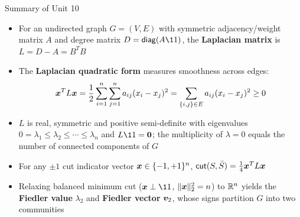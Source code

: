 \documentclass[aspectratio=169]{beamer}\usepackage[]{graphicx}\usepackage[]{xcolor}
\makeatletter
\newcommand{\hlnum}[1]{\textcolor[rgb]{0.686,0.059,0.569}{#1}}%
\newcommand{\hlopt}[1]{\textcolor[rgb]{0,0,0}{#1}}%
\newcommand{\hldef}[1]{\textcolor[rgb]{0.345,0.345,0.345}{#1}}%
\newcommand{\hlkwb}[1]{\textcolor[rgb]{0.69,0.353,0.396}{#1}}%
\newcommand{\hlkwc}[1]{\textcolor[rgb]{0.333,0.667,0.333}{#1}}%
\newcommand{\hlkwd}[1]{\textcolor[rgb]{0.737,0.353,0.396}{\textbf{#1}}}%
\newenvironment{kframe}{%
 \def\at@end@of@kframe{}%
 \ifinner\ifhmode%
  \def\at@end@of@kframe{\end{minipage}}%
  \begin{minipage}{\columnwidth}%
 \fi\fi%
 \def\FrameCommand##1{\hskip\@totalleftmargin \hskip-\fboxsep
 \colorbox{shadecolor}{##1}\hskip-\fboxsep
     \hskip-\linewidth \hskip-\@totalleftmargin \hskip\columnwidth}%
 \MakeFramed {\advance\hsize-\width
   \@totalleftmargin\z@ \linewidth\hsize
   \@setminipage}}%
 {\par\unskip\endMakeFramed%
 \at@end@of@kframe}
\newenvironment{knitrout}{}{} %
\makeatother
\begin{document}






\begin{frame}{Summary of Unit 10}
\begin{itemize}
\item For an undirected graph $G = (V, E)$ with symmetric adjacency/weight matrix $A$ and degree matrix $D = \diag(A\11)$, the \textbf{Laplacian matrix} is $L = D - A = B^T B$
\vfill
\item The \textbf{Laplacian quadratic form} measures smoothness across edges:
\[
\bm{x}^T L \bm{x} = \frac{1}{2}\sum_{i=1}^n \sum_{j=1}^n a_{ij}(x_i - x_j)^2 = \sum_{\{i, j\} \in E} a_{ij}(x_i - x_j)^2 \ge 0
\]
\vfill
\item $L$ is real, symmetric and positive semi-definite with eigenvalues $0 = \lambda_1 \le \lambda_2 \le \cdots \le \lambda_n$ and $L\11 = \b0$; the multiplicity of $\lambda = 0$ equals the number of connected components of $G$
\vfill
\item For any $\pm 1$ cut indicator vector $\bm{x} \in \{-1, +1\}^n$, $\mathsf{cut}(S, \bar{S}) = \frac{1}{4}\bm{x}^T L \bm{x}$
\vfill
\item Relaxing balanced minimum cut ($\bx \perp \11$, $\|\bm{x}\|_2^2 = n$) to $\mathbb{R}^n$ yields the \textbf{Fiedler value} $\lambda_2$ and \textbf{Fiedler vector} $\bm{v}_2$, whose signs partition $G$ into two communities
\end{itemize}
\end{frame}





\end{document}
